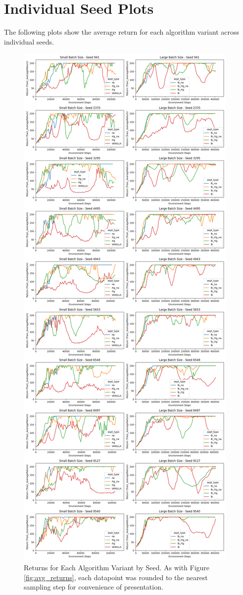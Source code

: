 \documentclass{article} %
\begin{document}
\newpage
\section{Individual Seed Plots} \label{sec:indiv_seed_plots}
The following plots show the average return for each algorithm variant across individual seeds.
\begin{figure}[h]
    \centering
    \captionsetup{justification=centering}
    \includegraphics[width = \linewidth, height = 0.85\textheight]{plots/return-vs-env-steps-seeds.png}
    \caption{Returns for Each Algorithm Variant by Seed. As with Figure \ref{fig:avg_returns},
    each datapoint was rounded to the nearest sampling step for convenience of presentation.}
    \label{fig:returns_by_seed}
\end{figure}
\end{document}
